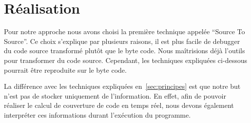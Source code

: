 \section{Réalisation}

Pour notre approche nous avons choisi la première technique appelée “Source To Source”. Ce choix s'explique par plusieurs raisons, il est plus facile de debugger du code source transformé plutôt que le byte code. Nous maîtrisions déjà l'outils pour transformer du code source. Cependant, les techniques expliquées ci-dessous pourrait être reproduite sur le byte code. \par La différence avec les techniques expliquées en~\ref{sec:principes} est que notre but n'est pas de stocker uniquement de l'information. En effet, afin de pouvoir réaliser le calcul de couverture de code en temps réel, nous devons également interpréter ces informations durant l'exécution du programme. 
